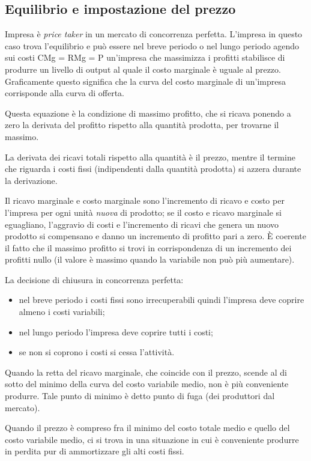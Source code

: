 \subsection{Equilibrio e impostazione del prezzo}

Impresa è \emph{price taker} in un mercato di concorrenza perfetta. L'impresa 
in questo caso trova l'equilibrio e può essere nel breve periodo o nel lungo 
periodo agendo sui costi CMg = RMg = P un'impresa che massimizza i profitti 
stabilisce di produrre un livello di output al quale il costo marginale è 
uguale al prezzo. Graficamente questo significa che la curva del costo 
marginale di un'impresa corrisponde alla curva di offerta.

Questa equazione è la condizione di massimo profitto, che si ricava ponendo 
a zero la derivata del profitto rispetto alla quantità prodotta, per trovarne 
il massimo.

La derivata dei ricavi totali rispetto alla quantità è il prezzo, 
mentre il termine che riguarda i costi fissi (indipendenti 
dalla quantità prodotta) si azzera durante la derivazione.

Il ricavo marginale e costo marginale sono l'incremento di ricavo e 
costo per l'impresa per ogni unità \emph{nuova} di prodotto; se il costo e 
ricavo marginale si eguagliano, l'aggravio di costi e l'incremento di ricavi 
che genera un nuovo prodotto si compensano e danno un incremento di profitto 
pari a zero. È coerente il fatto che il massimo profitto si trovi in 
corrispondenza di un incremento dei profitti nullo (il valore è massimo quando 
la variabile non può più aumentare).

La decisione di chiusura in concorrenza perfetta:

\begin{itemize} [noitemsep]
 \item nel breve periodo i costi fissi sono irrecuperabili quindi l'impresa 
deve coprire almeno i costi variabili;
 \item nel lungo periodo l'impresa deve coprire tutti i costi;
 \item se non si coprono i costi si cessa l'attività.
\end{itemize}

Quando la retta del ricavo marginale, che coincide con il prezzo, scende al di 
sotto del minimo della curva del costo variabile medio, non è più conveniente 
produrre. Tale punto di minimo è detto punto di fuga (dei produttori dal 
mercato).

Quando il prezzo è compreso fra il minimo del costo totale medio e quello del 
costo variabile medio, ci si trova in una situazione in cui è conveniente 
produrre in perdita pur di ammortizzare gli alti costi fissi.

